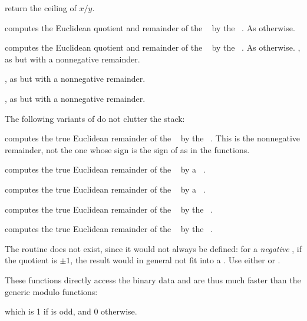  return the ceiling of $x / y$.

 computes the Euclidean quotient
and remainder of the ~ by the ~. As
 otherwise.

 computes the Euclidean quotient
and remainder of the ~ by the ~. As
 otherwise.
\smallskip
{}, as  but with a
nonnegative remainder.

, as  but with a
nonnegative remainder.

, as  but with a
nonnegative remainder.

 The following variants of  do not
clutter the stack:

 computes the true Euclidean
remainder of the ~ by the ~. This is the
nonnegative remainder, not the one whose sign is the sign of 
as in the  functions.

 computes the true Euclidean
remainder of the ~ by a ~.

 computes the true Euclidean
remainder of the ~ by a ~.

 computes the true Euclidean
remainder of the ~ by the ~.

 computes the true Euclidean
remainder of the ~ by the ~.

The routine  does not exist, since it would not always be
defined: for a \emph{negative} , if the quotient is $\pm1$, the result
 would in general not fit into a . Use either
 or .

These functions directly access the binary data and are thus much faster than
the generic modulo functions:

 which is 1 if  is odd, and 0 otherwise.


